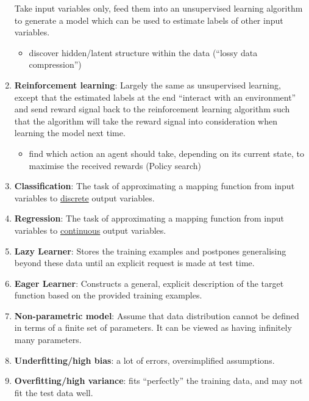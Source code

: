 \documentclass[twocolumn,landscape,10pt]{article}
\theoremstyle{definition}
\begin{document}
\begin{enumerate}
        Take input variables only, feed them into an unsupervised learning
        algorithm to generate a model which can be used to estimate labels of
        other input variables.
        \begin{itemize}
            \item discover hidden/latent structure within the data (``lossy data
                compression'')
        \end{itemize} 
    \item \textbf{Reinforcement learning}:
        Largely the same as unsupervised learning, except that
        the estimated labels at the end ``interact with an
        environment'' and send reward signal back to the reinforcement learning
        algorithm such that the algorithm will take the reward signal into
        consideration when learning the model next time.
        \begin{itemize}
            \item find which action an agent should take, depending on 
                its current state, to maximise the received rewards (Policy
                search)
        \end{itemize} 
    \item \textbf{Classification}:
        The task of approximating a mapping function from input variables to
        \underline{discrete} output variables.
    \item \textbf{Regression}:
        The task of approximating a mapping function from input variables to
        \underline{continuous} output variables.
    \item \textbf{Lazy Learner}:
        Stores the training examples and postpones generalising beyond these
        data until an explicit request is made at test time.
    \item \textbf{Eager Learner}:
        Constructs a general, explicit description of the target function based
        on the provided training examples.
    \item \textbf{Non-parametric model}: Assume that data distribution cannot be
        defined in terms of a finite set of parameters.
        It can be viewed as having infinitely many parameters.
    \item \textbf{Underfitting/high bias}: a lot of errors, oversimplified
        assumptions.
    \item \textbf{Overfitting/high variance}: fits ``perfectly'' the training
        data, and may not fit the test data well.
\end{enumerate} 
\end{document}
